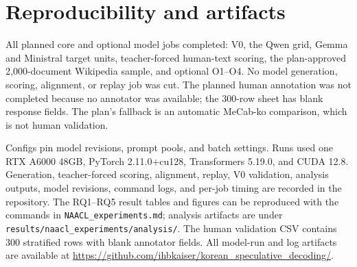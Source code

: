 \documentclass[11pt]{article}
\begin{document}
\section{Reproducibility and artifacts}
\label{app:repro}

All planned core and optional model jobs completed: V0, the Qwen grid, Gemma
and Ministral target units, teacher-forced human-text scoring, the
plan-approved 2,000-document Wikipedia sample, and optional O1--O4. No model
generation, scoring, alignment, or replay job was cut. The planned human
annotation was not completed because no annotator was available; the 300-row
sheet has blank response fields. The plan's fallback is an automatic MeCab-ko
comparison, which is not human validation.

Configs pin model revisions, prompt pools, and batch settings. Runs used one
RTX A6000 48GB, PyTorch 2.11.0+cu128, Transformers 5.19.0, and CUDA 12.8.
Generation, teacher-forced scoring, alignment, replay, V0 validation, analysis
outputs, model revisions, command logs, and per-job timing are recorded in the
repository. The RQ1--RQ5 result tables and figures can be reproduced with the
commands in \texttt{NAACL\_experiments.md}; analysis artifacts are under
\texttt{results/naacl\_experiments/analysis/}. The human validation CSV
contains 300 stratified rows with blank annotator fields. All model-run and
log artifacts are available at
\url{https://github.com/ihbkaiser/korean_speculative_decoding/}.


\end{document}
